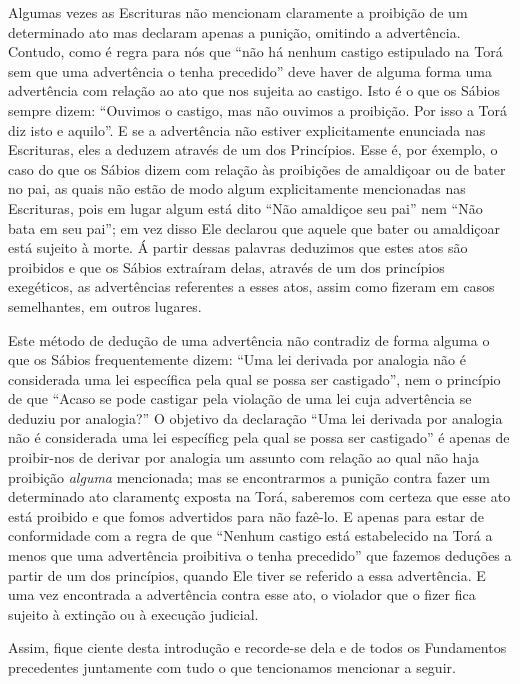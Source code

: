 Algumas vezes as Escrituras não mencionam claramente a proibição de um
determinado ato mas declaram apenas a punição, omitindo a advertência.
Contudo, como é regra para nós que ``não há nenhum castigo estipulado na
Torá sem que uma advertência o tenha precedido'' deve haver de alguma
forma uma advertência com relação ao ato que nos sujeita ao castigo.
Isto é o que os Sábios sempre dizem: ``Ouvimos o castigo, mas não
ouvimos a proibição. Por isso a Torá diz isto e aquilo''. E se a
advertência não estiver explicitamente enunciada nas Escrituras, eles a
deduzem através de um dos Princípios. Esse é, por éxemplo, o caso do que
os Sábios dizem com relação às proibições de amaldiçoar ou de bater no
pai, as quais não estão de modo algum explicitamente mencionadas nas
Escrituras, pois em lugar algum está dito ``Não amaldiçoe seu pai'' nem
``Não bata em seu pai''; em vez disso Ele declarou que aquele que bater
ou amaldiçoar está sujeito à morte. Á partir dessas palavras deduzimos
que estes atos são proibidos e que os Sábios extraíram delas, através de
um dos princípios exegéticos, as advertências referentes a esses atos,
assim como fizeram em casos semelhantes, em outros lugares.

Este método de dedução de uma advertência não contradiz de forma alguma
o que os Sábios frequentemente dizem: ``Uma lei derivada por analogia
não é considerada uma lei específica pela qual se possa ser castigado'',
nem o princípio de que ``Acaso se pode castigar pela violação de uma lei
cuja advertência se deduziu por analogia?'' O objetivo da declaração
``Uma lei derivada por analogia não é considerada uma lei específicg
pela qual se possa ser castigado'' é apenas de proibir-nos de derivar
por analogia um assunto com relação ao qual não haja proibição
\emph{alguma} mencionada; mas se encontrarmos a punição contra fazer um
determinado ato claramentç exposta na Torá, saberemos com certeza que
esse ato está proibido e que fomos advertidos para não fazê-lo. E apenas
para estar de conformidade com a regra de que ``Nenhum castigo está
estabelecido na Torá a menos que uma advertência proibitiva o tenha
precedido'' que fazemos deduções a partir de um dos princípios, quando
Ele tiver se referido a essa advertência. E uma vez encontrada a
advertência contra esse ato, o violador que o fizer fica sujeito à
extinção ou à execução judicial.

Assim, fique ciente desta introdução e recorde-se dela e de todos os
Fundamentos precedentes juntamente com tudo o que tencionamos mencionar
a seguir.

